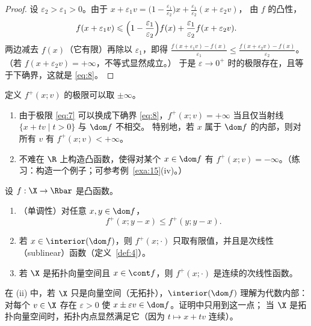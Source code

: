 \begin{proof}
设 $\varepsilon_2>\varepsilon_1>0$。由于
$x+\varepsilon_1v=\bigl(1-\tfrac{\varepsilon_1}{\varepsilon_2}\bigr)x+\tfrac{\varepsilon_1}{\varepsilon_2}(x+\varepsilon_2v)$，
由 $f$ 的凸性，
\[
  f(x+\varepsilon_1v)\leqslant\Bigl(1-\frac{\varepsilon_1}{\varepsilon_2}\Bigr)f(x)+\frac{\varepsilon_1}{\varepsilon_2}f(x+\varepsilon_2v).
\]
两边减去 $f(x)$（它有限）再除以 $\varepsilon_1$，即得
$\frac{f(x+\varepsilon_1v)-f(x)}{\varepsilon_1}\leqslant\frac{f(x+\varepsilon_2v)-f(x)}{\varepsilon_2}$。
（若 $f(x+\varepsilon_2v)=+\infty$，不等式显然成立。）
于是 $\varepsilon\to0^+$ 时的极限存在，且等于下确界，这就是 \eqref{eq:8}。
\end{proof}

\begin{remark}
\label{rem:10}
定义 $f^+(x;v)$ 的极限可以取 $\pm\infty$。
\begin{enumerate}[label=(\roman*)]
  \item 由于极限 \eqref{eq:7} 可以换成下确界 \eqref{eq:8}，$f^+(x;v)=+\infty$ 当且仅当射线 $\{x+tv\mid t>0\}$ 与 $\dom f$ 不相交。
        特别地，若 $x$ 属于 $\dom f$ 的内部，则对所有 $v$ 有 $f^+(x;v)<+\infty$。
  \item 不难在 $\R$ 上构造凸函数，使得对某个 $x\in\dom f$ 有 $f^+(x;v)=-\infty$。（练习：构造一个例子；可参考例~\ref{exa:15}(iv)。）
\end{enumerate}
\end{remark}

\begin{proposition}
\label{res:33}
设 $f:\X\to\Rbar$ 是凸函数。
\begin{enumerate}[label=(\roman*)]
  \item （单调性）对任意 $x,y\in\dom f$，
        \begin{equation}
          f^+(x;y-x)\leqslant f^+(y;y-x).
          \label{eq:9}
        \end{equation}
  \item 若 $x\in\interior(\dom f)$，则 $f^+(x;\cdot)$ 只取有限值，并且是次线性（sublinear）函数（定义~\ref{def:4}）。
  \item 若 $\X$ 是拓扑向量空间且 $x\in\cont f$，则 $f^+(x;\cdot)$ 是连续的次线性函数。
\end{enumerate}
\end{proposition}

在 (ii) 中，若 $\X$ 只是向量空间（无拓扑），$\interior(\dom f)$ 理解为代数内部：
对每个 $v\in\X$ 存在 $\varepsilon>0$ 使 $x\pm\varepsilon v\in\dom f$。证明中只用到这一点；
当 $\X$ 是拓扑向量空间时，拓扑内点显然满足它（因为 $t\mapsto x+tv$ 连续）。


